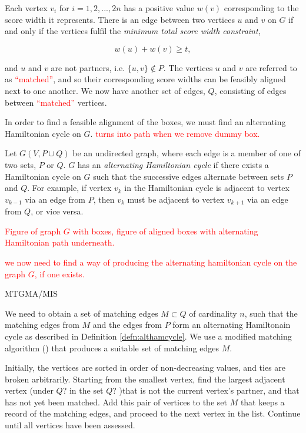 \documentclass[oribibl]{llncs}
\begin{document}
Each vertex $v_i$ for $i = 1, 2, ..., 2n$ has a positive value $w(v)$ corresponding to the score width it represents. There is an edge between two vertices $u$ and $v$ on $G$ if and only if the vertices fulfil the \textit{minimum total score width constraint}, 

\begin{equation*}
w(u) + w(v) \geq t,
\end{equation*}

and $u$ and $v$ are not partners, i.e. $\{u, v\} \notin P$. The vertices $u$ and $v$ are referred to as \textcolor{red}{``matched''}, and so their corresponding score widths can be feasibly aligned next to one another. We now have another set of edges, $Q$, consisting of edges between \textcolor{red}{``matched''} vertices.  

In order to find a feasible alignment of the boxes, we must find an alternating Hamiltonian cycle on $G$. \textcolor{red}{turns into path when we remove dummy box.}

\begin{definition}
	\label{defn:althamcycle}
	Let $G(V, P\cup Q)$ be an undirected graph, where each edge is a member of one of two sets, $P$ or $Q$. $G$ has an \textit{alternating Hamiltonian cycle} if there exists a Hamiltonian cycle on $G$ such that the successive edges alternate between sets $P$ and $Q$. For example, if vertex $v_k$ in the Hamiltonian cycle is adjacent to vertex $v_{k-1}$ via an edge from $P$, then $v_k$ must be adjacent to vertex $v_{k+1}$ via an edge from $Q$, or vice versa. 
\end{definition}

\textcolor{red}{Figure of graph $G$ with boxes, figure of aligned boxes with alternating Hamiltonian path underneath.}

\textcolor{red}{we now need to find a way of producing the alternating hamiltonian cycle on the graph $G$, if one exists.}

MTGMA/MIS

We need to obtain a set of matching edges $M \subset Q$ of cardinality $n$, such that the matching edges from $M$ and the edges from $P$ form an alternating Hamiltonain cycle as described in Definition \ref{defn:althamcycle}. We use a modified matching algorithm (\citealp{mahadev1994, becker2010}) that produces a suitable set of matching edges $M$. 

Initially, the vertices are sorted in order of non-decreasing values, and ties are broken arbitrarily. Starting from the smallest vertex, find the largest adjacent vertex (under $Q$? in the set $Q$? )that is not the current vertex's partner, and that has not yet been matched. Add this pair of vertices to the set $M$ that keeps a record of the matching edges, and proceed to the next vertex in the list. Continue until all vertices have been assessed. 
\end{document}
